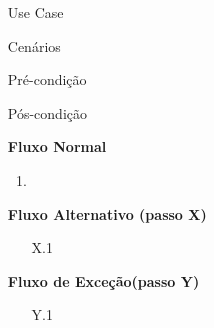 \documentclass[../relatorio.tex]{subfiles}
\begin{document}
\begin{itemize}
    \item[Use Case] {\underline{}}
    \item[Cenários] {}
    \item[Pré-condição] {}
    \item[Pós-condição] {}
          \begin{flushleft}
              \textbf{Fluxo Normal}
          \end{flushleft}
          \begin{enumerate}
              \item
          \end{enumerate}
          \begin{flushleft}
              \textbf{Fluxo Alternativo (passo X)}
          \end{flushleft}
          \begin{itemize}
              \item[X.1]{}
          \end{itemize}
          \begin{flushleft}
              \textbf{Fluxo de Exceção(passo Y)}
          \end{flushleft}

          \begin{itemize}
              \item[Y.1]{}
          \end{itemize}
\end{itemize}
\end{document}
